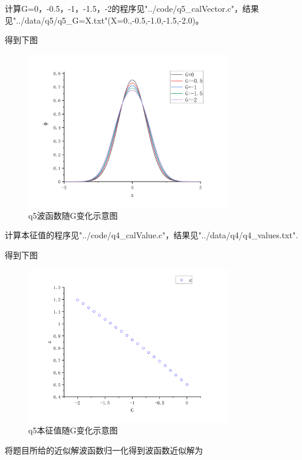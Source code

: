 \documentclass[10pt, a4paper]{article}
\begin{document}
     计算G=0，-0.5，-1，-1.5，-2的程序见"../code/q5_calVector.c"，结果见"../data/q5/q5_G=X.txt"(X=0.,-0.5,-1.0,-1.5,-2.0)。

     得到下图

     \begin{figure}[H]
      \centering
      \includegraphics[width=0.8\textwidth]{q5波函数随G变化示意图.jpg}
      \caption{q5波函数随G变化示意图}\label{fig:q5波函数随G变化示意图}
    \end{figure}

     计算本征值的程序见"../code/q4_calValue.c"，结果见"../data/q4/q4_values.txt".

     得到下图

     \begin{figure}[H]
      \centering
      \includegraphics[width=0.8\textwidth]{q5本征值随G变化示意图.jpg}
      \caption{q5本征值随G变化示意图}\label{fig:q5本征值随G变化示意图}
    \end{figure}

    将题目所给的近似解波函数归一化得到波函数近似解为
\end{document}

